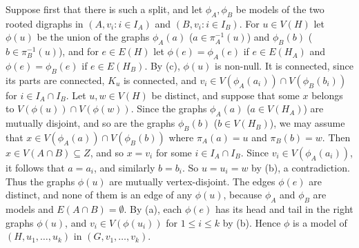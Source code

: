 {Suppose first that there is such a split, and let $\phi_A, \phi_B$ be models of the two rooted digraphs in $(A, v_i : i \in I_A)$ and $(B, v_i : i \in I_B)$. For $u \in V(H)$ let $\phi(u)$ be the union of the graphs $\phi_A(a)$ ($a \in \pi_A^{-1}(u)$) and $\phi_B(b)$ ($b \in \pi_B^{-1}(u)$), and for $e \in E(H)$ let $\phi(e) = \phi_A(e)$ if $e \in E(H_A)$ and $\phi(e) = \phi_B(e)$ if $e \in E(H_B)$. By (c), $\phi(u)$ is non-null. It is connected, since its parts are connected, $K_u$ is connected, and $v_i \in V(\phi_A(a_i)) \cap V(\phi_B(b_i))$ for $i \in I_A \cap I_B$. Let $u, w \in V(H)$ be distinct, and suppose that some $x$ belongs to $V(\phi(u)) \cap V(\phi(w))$. Since the graphs $\phi_A(a)$ ($a \in V(H_A)$) are mutually disjoint, and so are the graphs $\phi_B(b)$ ($b \in V(H_B)$), we may assume that $x \in V(\phi_A(a)) \cap V(\phi_B(b))$ where $\pi_A(a) = u$ and $\pi_B(b) = w$. Then $x \in V(A \cap B) \subseteq Z$, and so $x = v_i$ for some $i \in I_A \cap I_B$. Since $v_i \in V(\phi_A(a_i))$, it follows that $a = a_i$, and similarly $b = b_i$. So $u = u_i = w$ by (b), a contradiction. Thus the graphs $\phi(u)$ are mutually vertex-disjoint. The edges $\phi(e)$ are distinct, and none of them is an edge of any $\phi(u)$, because $\phi_A$ and $\phi_B$ are models and $E(A \cap B) = \emptyset$. By (a), each $\phi(e)$ has its head and tail in the right graphs $\phi(u)$, and $v_i \in V(\phi(u_i))$ for $1 \le i \le k$ by (b). Hence $\phi$ is a model of $(H, u_1, \dots, u_k)$ in $(G, v_1, \dots, v_k)$.

}
